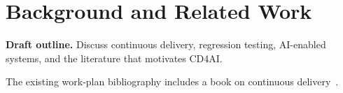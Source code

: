 \chapter{Background and Related Work}
\label{chap:background}

\textbf{Draft outline.} Discuss continuous delivery, regression testing,
AI-enabled systems, and the literature that motivates CD4AI.

The existing work-plan bibliography includes a book on continuous
delivery~\cite{Humble:ContinuousDelivery:2010}.
